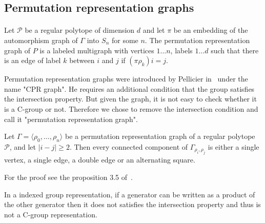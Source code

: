 \subsection{Permutation representation graphs}

\paragraph{}

\begin{definition}
  Let $\mathcal P$ be a regular polytope of dimension $d$ and let $\pi$ be an embedding of the automorphism graph of $\Gamma$ into $S_n$ for some $n$. The permutation representation graph of $P$ is a labeled multigraph with vertices ${1 \dots n}$, labels ${1 \dots d}$ such that there is an edge of label $k$ between $i$ and $j$ if $(\pi \rho_k)i = j$.
\end{definition}

Permutation representation graphs were introduced by Pellicier in~\cite{cprGraph} under the name "CPR graph". He requires an additional condition that the group satisfies the intersection property. But given the graph, it is not easy to check whether it is a C-group or not. Therefore we chose to remove the intersection condition and call it "permutation representation graph".

\begin{property}
  \label{intersection-patterns}
  Let $\Gamma = \langle \rho_0, \dots, \rho_n \rangle$ be a permutation representation graph of a regular polytope $\mathcal P$, and let $|i - j| \ge 2$. Then every connected component of $\Gamma_{\rho_i,\rho_j}$ is either a single vertex, a single edge, a double edge or an alternating square.
\end{property}

For the proof see the proposition 3.5 of~\cite{cprGraph}.

\begin{property}
  \label{generators-not-free}
  In a indexed group representation, if a generator can be written as a product of the other generator then it does not satisfies the intersection property and thus is not a C-group representation.
\end{property}
